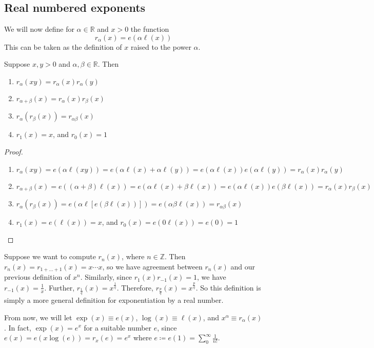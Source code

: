 \subsection{Real numbered exponents}
We will now define for \(\alpha \in \mathbb R\) and \(x > 0\) the function
\[
	r_\alpha(x) = e(\alpha \ell(x))
\]
This can be taken as the definition of \(x\) raised to the power \(\alpha\).
\begin{theorem}
	Suppose \(x, y > 0\) and \(\alpha, \beta \in \mathbb R\).
	Then
	\begin{enumerate}
		\item \(r_\alpha(xy) = r_\alpha(x)r_\alpha(y)\)
		\item \(r_{\alpha + \beta}(x) = r_\alpha(x) r_\beta(x)\)
		\item \(r_\alpha(r_\beta(x)) = r_{\alpha\beta}(x)\)
		\item \(r_1(x) = x\), and \(r_0(x) = 1\)
	\end{enumerate}
\end{theorem}
\begin{proof}
	\begin{enumerate}
		\item \(r_\alpha(xy) = e(\alpha \ell(xy)) = e(\alpha \ell(x) + \alpha \ell(y)) = e(\alpha \ell(x))e(\alpha\ell(y)) = r_\alpha(x)r_\alpha(y)\)
		\item \(r_{\alpha + \beta}(x) = e((\alpha + \beta) \ell(x)) = e(\alpha\ell(x) + \beta\ell(x)) = e(\alpha\ell(x))e(\beta\ell(x)) = r_\alpha(x) r_\beta(x)\)
		\item \(r_\alpha(r_\beta(x)) = e(\alpha \ell[e(\beta \ell(x))]) = e(\alpha \beta \ell(x)) = r_{\alpha\beta}(x)\)
		\item \(r_1(x) = e(\ell(x)) = x\), and \(r_0(x) = e(0 \ell(x)) = e(0) = 1\)
	\end{enumerate}
\end{proof}
Suppose we want to compute \(r_n(x)\), where \(n \in\mathbb Z\).
Then \(r_n(x) = r_{1 + \dots + 1}(x) = x \cdots x\), so we have agreement between \(r_n(x)\) and our previous definition of \(x^n\).
Similarly, since \(r_1(x) r_{-1}(x) = 1\), we have \(r_{-1}(x) = \frac{1}{x}\).
Further, \(r_{\frac{1}{q}}(x) = x^\frac{1}{q}\).
Therefore, \(r_{\frac{p}{q}}(x) = x^{\frac{p}{q}}\).
So this definition is simply a more general definition for exponentiation by a real number.

From now, we will let \(\exp(x) \equiv e(x)\), \(\log(x) \equiv \ell(x)\), and \(x^\alpha \equiv r_\alpha(x)\).
In fact, \(\exp(x) = e^x\) for a suitable number \(e\), since \(e(x) = e(x \log(e)) = r_x(e) = e^x\) where \(e \coloneq e(1) = \sum_0^\infty \frac{1}{n!}\).

